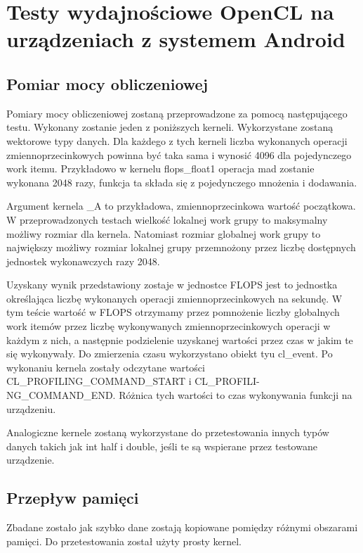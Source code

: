 \section[Testy wydajnościowe OpenCL na urządzeniach z systemem Android]{Testy wydajnościowe OpenCL na urządzeniach z systemem Android}

\subsection[Pomiar mocy obliczeniowej]{Pomiar mocy obliczeniowej}
Pomiary mocy obliczeniowej zostaną przeprowadzone za pomocą następującego testu.
Wykonany zostanie jeden z poniższych kerneli. Wykorzystane zostaną wektorowe typy danych. Dla każdego z tych kerneli liczba wykonanych operacji zmiennoprzecinkowych powinna być taka sama i wynosić 4096 dla pojedynczego work itemu. Przykładowo w kernelu flops\_float1 operacja mad zostanie wykonana 2048 razy, funkcja ta składa się z pojedynczego mnożenia i dodawania.

Argument kernela \_A to przykładowa, zmiennoprzecinkowa wartość początkowa. W przeprowadzonych testach wielkość lokalnej work grupy to maksymalny możliwy rozmiar dla kernela. Natomiast rozmiar globalnej work grupy to największy możliwy rozmiar lokalnej grupy przemnożony przez liczbę dostępnych jednostek wykonawczych razy 2048.

Uzyskany wynik przedstawiony zostaje w jednostce FLOPS jest to jednostka określająca liczbę wykonanych operacji zmiennoprzecinkowych na sekundę. W tym teście wartość w FLOPS otrzymamy przez pomnożenie liczby globalnych work itemów przez liczbę wykonywanych zmiennoprzecinkowych operacji w każdym z nich, a następnie podzielenie uzyskanej wartości przez czas w jakim te się wykonywały. Do zmierzenia czasu wykorzystano obiekt tyu cl\_event. Po wykonaniu kernela zostały odczytane wartości CL\_PROFILING\_COMMAND\_START i CL\_PROFILI- NG\_COMMAND\_END. Różnica tych wartości to czas wykonywania funkcji na urządzeniu.

Analogiczne kernele zostaną wykorzystane do przetestowania innych typów danych takich jak int half i double, jeśli te są wspierane przez testowane urządzenie.

\subsection[Przepływ pamięci]{Przepływ pamięci}
Zbadane zostało jak szybko dane zostają kopiowane pomiędzy różnymi obszarami pamięci. Do przetestowania został użyty prosty kernel.

